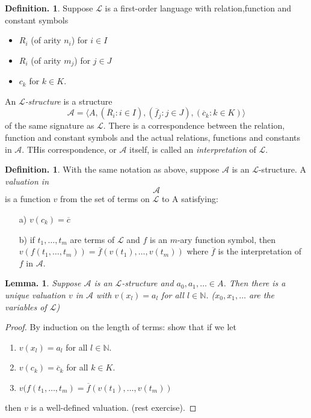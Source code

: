 \documentclass[a4paper,oneside,11pt,DIV=12,parskip=half]{scrartcl}
\newcommand{\N}{\mathbb N}
\newcommand{\LL}{\mathcal L}
\theoremstyle{plain}
\newtheorem{lemma}[theorem]{Lemma.}
\theoremstyle{definition}
\newtheorem{definition}[theorem]{Definition.}
\newtheorem{remark, definition}[theorem]{Remark and Definition.}
\newtheorem{lemma, definition}[theorem]{Lemma and Definition.}
\newtheorem{theorem, definition}[theorem]{Theorem and Definition.}
\theoremstyle{remark}
\newtheorem*{remark, example}{\textbf{Remark and Exercise}}
\begin{document}
\begin{definition}
Suppose $\LL$ is a first-order language with relation,function and constant symbols
\begin{itemize}
    \item $R_i$ (of arity $n_i$) for $i \in I$
    \item $R_i$ (of arity $m_j$) for $j \in J$
    \item $c_k$ for $k \in K$.
\end{itemize}
An \emph{$\LL$-structure} is a structure 
\[ \mathcal{A} = \big \langle A, (\overline{R}_i : i\in I), (\overline{f}_j : j\in J), (\overline{c}_k : k\in K) \big \rangle \] of the same signature as $\LL$.
There is a correspondence between the relation, function and constant symbols and the actual relations, functions and constants in $\mathcal{A}$. THis correspondence, or $\mathcal{A}$ itself, is called an \emph{interpretation} of $\LL$.
\end{definition}

\begin{definition}
With the same notation as above, suppose $\mathcal{A}$ is an $\LL$-structure. A \emph{valuation in $$\mathcal{A}$$} is a function $v$ from the set of terms on $\LL$ to A satisfying:
\begin{itemize}
    \item[a)] $v(c_k) = \overline{c}$
    \item[b)] if $t_1,\dots, t_m$ are terms of $\LL$ and $f$ is an $m$-ary function symbol, then $v(f(t_1,\dots,t_m)) = \overline{f}(v(t_1),\dots,v(t_m))$ where $\overline{f}$ is the interpretation of $f$ in $\mathcal{A}$.
\end{itemize}
\end{definition}

\begin{lemma}
Suppose $\mathcal{A}$ is an $\LL$-structure and $a_0,a_1,\dots \in A$. Then there is a unique valuation $v$ in $\mathcal{A}$ with $v(x_l) =a_l$ for all $l \in \N$.
($x_0,x_1,\dots$ are the variables of $\LL$)
\end{lemma}

\begin{proof}
By induction on the length of terms: show that if we let
\begin{enumerate}
    \item $v(x_l) = a_l$ for all $l \in \N$.
    \item $v(c_k) = \overline{c}_k$ for all $k \in K$.
    \item $v(f(t_1,\dots,t_m) = \overline{f}(v(t_1),\dots,v(t_m))$
\end{enumerate}
then $v$ is a well-defined valuation. (rest exercise).
\end{proof}
\end{document}
